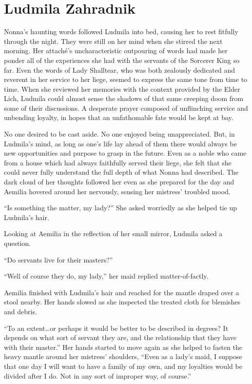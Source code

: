 \chapter{Ludmila Zahradnik}

Nonna’s haunting words followed Ludmila into bed, causing her to rest fitfully through the night. They were still on her mind when she stirred the next morning. Her attaché’s uncharacteristic outpouring of words had made her ponder all of the experiences she had with the servants of the Sorcerer King so far. Even the words of Lady Shalltear, who was both zealously dedicated and reverent in her service to her liege, seemed to express the same tone from time to time. When she reviewed her memories with the context provided by the Elder Lich, Ludmila could almost sense the shadows of that same creeping doom from some of their discussions. A desperate prayer composed of unflinching service and unbending loyalty, in hopes that an unfathomable fate would be kept at bay.

 

No one desired to be cast aside. No one enjoyed being unappreciated. But, in Ludmila’s mind, as long as one’s life lay ahead of them there would always be new opportunities and purpose to grasp in the future. Even as a noble who came from a house which had always faithfully served their liege, she felt that she could never fully understand the full depth of what Nonna had described. The dark cloud of her thoughts followed her even as she prepared for the day and Aemilia hovered around her nervously, sensing her mistress’ troubled mood.

 

“Is something the matter, my lady?” She asked worriedly as she helped tie up Ludmila’s hair.

 

Looking at Aemilia in the reflection of her small mirror, Ludmila asked a question.

 

“Do servants live for their masters?”

 

“Well of course they do, my lady,” her maid replied matter-of-factly.

 

Aemilia finished with Ludmila’s hair and reached for the mantle draped over a stool nearby. Her hands slowed as she inspected the treated cloth for blemishes and debris.

 

“To an extent…or perhaps it would be better to be described in degrees? It depends on what sort of servant they are, and the relationship that they have with their master.” Her hands started to move again as she helped to fasten the heavy mantle around her mistress’ shoulders, “Even as a lady’s maid, I suppose that one day I will want to have a family of my own, and my loyalties would be divided after I do. Not in any sort of improper way, of course.”

